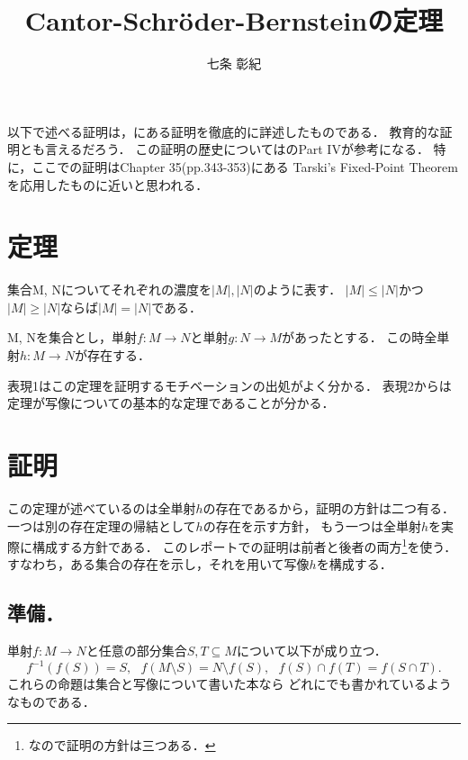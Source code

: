 \documentclass[a4j, 10pt]{jarticle}
\title{Cantor-Schr\"{o}der-Bernsteinの定理}
\author{七条 彰紀}
\begin{document}
    \maketitle
    
    以下で述べる証明は，\cite{thebook}にある証明を徹底的に詳述したものである．
    教育的な証明とも言えるだろう．
    この証明の歴史については\cite{cbt}のPart IVが参考になる．
    特に，ここでの証明はChapter 35(pp.343-353)にある
    Tarski’s Fixed-Point Theoremを応用したものに近いと思われる．

    \section{定理}
    \begin{Them}[表現1]
        集合M, Nについてそれぞれの濃度を$|M|, |N|$のように表す．
        $|M| \leq |N|$かつ$|M| \geq |N|$ならば$|M|=|N|$である．
    \end{Them}

    \begin{Them}[表現2]
        M, Nを集合とし，単射$f:M \to N$と単射$g: N \to M$があったとする．
        この時全単射$h:M \to N$が存在する．
    \end{Them}

    表現1はこの定理を証明するモチベーションの出処がよく分かる．
    表現2からは定理が写像についての基本的な定理であることが分かる．

    \section{証明}
    この定理が述べているのは全単射$h$の存在であるから，証明の方針は二つ有る．
    一つは別の存在定理の帰結として$h$の存在を示す方針，
    もう一つは全単射$h$を実際に構成する方針である．
    このレポートでの証明は前者と後者の両方\footnote{なので証明の方針は三つある．}を使う．
    すなわち，ある集合の存在を示し，それを用いて写像$h$を構成する．

    \subsection{準備．}
    単射$f: M \to N$と任意の部分集合$S,T \subseteq M$について以下が成り立つ．
    \[
        f^{-1}(f(S))=S,~~~
        f(M \setminus S)=N \setminus f(S),~~~
        f(S) \cap f(T)=f(S \cap T).
    \]
    これらの命題は集合と写像について書いた本なら
    どれにでも書かれているようなものである．
\end{document}
